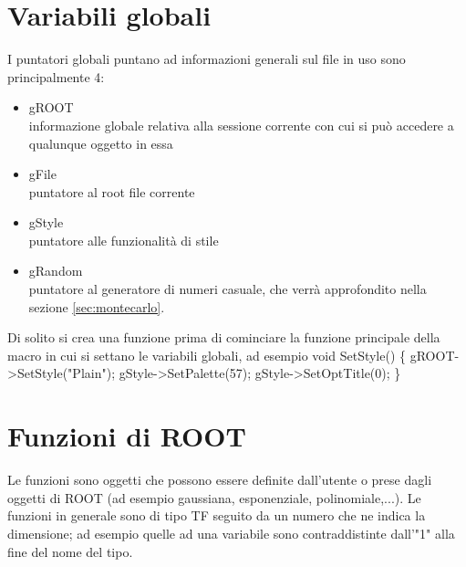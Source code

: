 \documentclass[10pt,a4paper]{article}
\begin{document}
\section{Variabili globali}
I puntatori globali puntano ad informazioni generali sul file in uso sono principalmente 4:
\begin{itemize}
	\item gROOT\\
	informazione globale relativa alla sessione corrente con cui si può accedere a qualunque oggetto in essa
	\item gFile\\
	puntatore al root file corrente
	\item gStyle\\
	puntatore alle funzionalità di stile
	\item gRandom\\
	puntatore al generatore di numeri casuale, che verrà approfondito nella sezione \ref{sec:montecarlo}.
\end{itemize}
Di solito si crea una funzione prima di cominciare la funzione principale della macro in cui si settano le variabili globali, ad esempio
void SetStyle() \{
	gROOT->SetStyle("Plain");
	gStyle->SetPalette(57);
	gStyle->SetOptTitle(0);
\}
\section{Funzioni di ROOT}
Le funzioni sono oggetti che possono essere definite dall'utente o prese dagli oggetti di ROOT (ad esempio gaussiana, esponenziale, polinomiale,...). Le funzioni in generale sono di tipo TF seguito da un numero che ne indica la dimensione; ad esempio quelle ad una variabile sono contraddistinte dall'"1" alla fine del nome del tipo.
\end{document}
